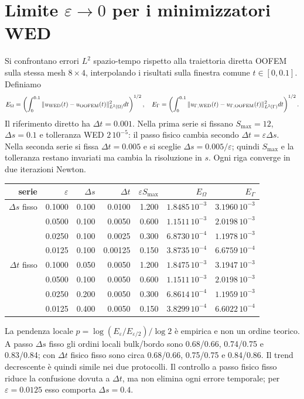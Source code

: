 \documentclass[10pt,a4paper]{article}
\begin{document}
\section{Limite $\varepsilon\to0$ per i minimizzatori WED}
Si confrontano errori $L^2$ spazio-tempo rispetto alla traiettoria diretta OOFEM sulla stessa mesh $8\times4$, interpolando i risultati sulla finestra comune $t\in[0,0.1]$. Definiamo
\[
 E_\Omega=\left(\int_0^{0.1}\|u_{\rm WED}(t)-u_{\rm OOFEM}(t)\|^2_{L^2(\Omega)}dt\right)^{1/2},\quad
 E_\Gamma=\left(\int_0^{0.1}\|u_{\Gamma,\rm WED}(t)-u_{\Gamma,\rm OOFEM}(t)\|^2_{L^2(\Gamma)}dt\right)^{1/2}.
\]
Il riferimento diretto ha $\Delta t=0.001$. Nella prima serie si fissano $S_{\max}=12$, $\Delta s=0.1$ e tolleranza WED $2\,10^{-5}$: il passo fisico cambia secondo $\Delta t=\varepsilon\Delta s$. Nella seconda serie si fissa $\Delta t=0.005$ e si sceglie $\Delta s=0.005/\varepsilon$; quindi $S_{\max}$ e la tolleranza restano invariati ma cambia la risoluzione in $s$. Ogni riga converge in due iterazioni Newton.
\begin{center}\small
\begin{tabular}{rrrrrrr}
\toprule
serie&$\varepsilon$&$\Delta s$&$\Delta t$&$\varepsilon S_{\max}$&$E_\Omega$&$E_\Gamma$\\
\midrule
$\Delta s$ fisso&0.1000&0.100&0.0100&1.200&$1.8485\,10^{-3}$&$3.1960\,10^{-3}$\\
&0.0500&0.100&0.0050&0.600&$1.1511\,10^{-3}$&$2.0198\,10^{-3}$\\
&0.0250&0.100&0.0025&0.300&$6.8730\,10^{-4}$&$1.1978\,10^{-3}$\\
&0.0125&0.100&0.00125&0.150&$3.8735\,10^{-4}$&$6.6759\,10^{-4}$\\
$\Delta t$ fisso&0.1000&0.050&0.0050&1.200&$1.8475\,10^{-3}$&$3.1947\,10^{-3}$\\
&0.0500&0.100&0.0050&0.600&$1.1511\,10^{-3}$&$2.0198\,10^{-3}$\\
&0.0250&0.200&0.0050&0.300&$6.8614\,10^{-4}$&$1.1959\,10^{-3}$\\
&0.0125&0.400&0.0050&0.150&$3.8299\,10^{-4}$&$6.6022\,10^{-4}$\\
\bottomrule
\end{tabular}
\end{center}
La pendenza locale $p=\log(E_{\varepsilon}/E_{\varepsilon/2})/\log 2$ è empirica e non un ordine teorico. A passo $\Delta s$ fisso gli ordini locali bulk/bordo sono 0.68/0.66, 0.74/0.75 e 0.83/0.84; con $\Delta t$ fisico fisso sono circa 0.68/0.66, 0.75/0.75 e 0.84/0.86. Il trend decrescente è quindi simile nei due protocolli. Il controllo a passo fisico fisso riduce la confusione dovuta a $\Delta t$, ma non elimina ogni errore temporale; per $\varepsilon=0.0125$ esso comporta $\Delta s=0.4$.
\end{document}
